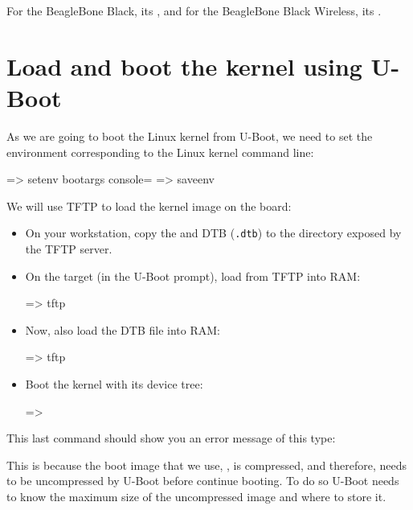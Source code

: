 {For the BeagleBone Black, its ,
and for the BeagleBone Black Wireless, its
.}
{}

\section{Load and boot the kernel using U-Boot}

As we are going to boot the Linux kernel from U-Boot,
we need to set the  environment corresponding
to the Linux kernel command line:

\begin{ubootinput}
=> setenv bootargs console=%
=> saveenv
\end{ubootinput}
We will use TFTP to load the kernel image on the board:

\begin{itemize}

\item On your workstation, copy the {\tt {}} and DTB
(\texttt{\dtname}\texttt{.dtb}) to the directory exposed by the TFTP server.

\item On the target (in the U-Boot prompt), load {\tt {}} from
TFTP into RAM:
\begin{ubootinput}
=> tftp %
\end{ubootinput}

\item Now, also load the DTB file into RAM:
\begin{ubootinput}
=> tftp %
\end{ubootinput}

\item Boot the kernel with its device tree:
\begin{ubootinput}
=> %
\end{ubootinput}

\end{itemize}

\if{}
This last command should show you an error message of this type:

This is because the boot image that we use, , is compressed, and
therefore, needs to be uncompressed by U-Boot before continue booting. To do so
U-Boot needs to know the maximum size of the uncompressed image and where to
store it.

